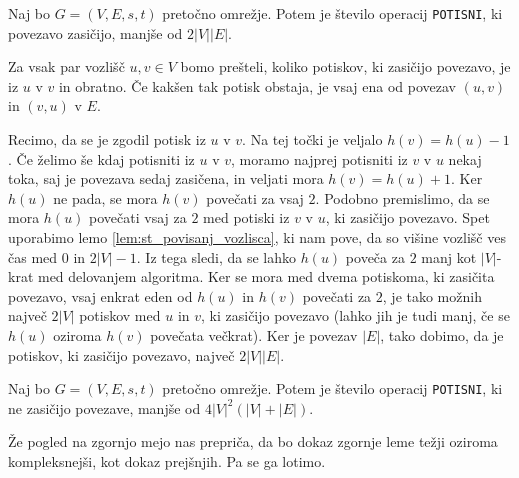 \documentclass[mat1]{fmfdelo}
\begin{document}
\begin{lema}\label{lem:om_st_op_potisni_nas}
Naj bo $G=(V,E,s,t)$ pretočno omrežje. Potem je število operacij \texttt{POTISNI}, ki povezavo zasičijo, manjše od $2|V||E|$.
\end{lema}

\begin{dokaz}
Za vsak par vozlišč $u,v \in V$ bomo prešteli, koliko potiskov, ki zasičijo povezavo, je iz $u$ v $v$ in obratno. Če kakšen tak potisk obstaja, je vsaj ena od povezav $(u,v)$ in $(v,u)$ v $E$.

Recimo, da se je zgodil potisk iz $u$ v $v$. Na tej točki je veljalo $h(v) = h(u) - 1$. Če želimo še kdaj potisniti iz $u$ v $v$, moramo najprej potisniti iz $v$ v $u$ nekaj toka, saj je povezava sedaj zasičena, in veljati mora $h(v) = h(u) + 1$. Ker $h(u)$ ne pada, se mora $h(v)$ povečati za vsaj $2$. Podobno premislimo, da se mora $h(u)$ povečati vsaj za $2$ med potiski iz $v$ v $u$, ki zasičijo povezavo. Spet uporabimo lemo \ref{lem:st_povisanj_vozlisca}, ki nam pove, da so višine vozlišč ves čas med $0$ in $2|V|-1$. Iz tega sledi, da se lahko $h(u)$ poveča za $2$ manj kot $|V|$-krat med delovanjem algoritma. Ker se mora med dvema potiskoma, ki zasičita povezavo, vsaj enkrat eden od $h(u)$ in $h(v)$ povečati za $2$, je tako možnih največ $2|V|$ potiskov med $u$ in $v$, ki zasičijo povezavo (lahko jih je tudi manj, če se $h(u)$ oziroma $h(v)$ povečata večkrat). Ker je povezav $|E|$, tako dobimo, da je potiskov, ki zasičijo povezavo, največ $2|V||E|$.
\end{dokaz}

\begin{lema} \label{lem:om_st_op_potisni_nezas}
Naj bo $G=(V,E,s,t)$ pretočno omrežje. Potem je število operacij \texttt{POTISNI}, ki ne zasičijo povezave, manjše od $4|V|^2 (|V| + |E|)$.
\end{lema}

Že pogled na zgornjo mejo nas prepriča, da bo dokaz zgornje leme težji oziroma kompleksnejši, kot dokaz prejšnjih. Pa se ga lotimo.
\end{document}
